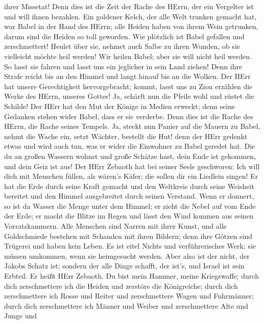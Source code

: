 ihrer Missetat! Denn dies ist die Zeit der Rache des HErrn, der ein
Vergelter ist und will ihnen bezahlen.  Ein goldener Kelch,
der alle Welt trunken gemacht hat, war Babel in der Hand des HErrn; alle
Heiden haben von ihrem Wein getrunken, darum sind die Heiden so toll
geworden.  Wie plötzlich ist Babel gefallen und
zerschmettert! Heulet über sie, nehmet auch Salbe zu ihren Wunden, ob
sie vielleicht möchte heil werden!  Wir heilen Babel; aber
sie will nicht heil werden. So lasst sie fahren und lasst uns ein
jeglicher in sein Land ziehen! Denn ihre Strafe reicht bis an den Himmel
und langt hinauf bis an die Wolken.  Der HErr hat unsere
Gerechtigkeit hervorgebracht; kommt, lasst uns zu Zion erzählen die
Werke des HErrn, unseres Gottes!  Ja, schärft nun die
Pfeile wohl und rüstet die Schilde! Der HErr hat den Mut der Könige in
Medien erweckt; denn seine Gedanken stehen wider Babel, dass er sie
verderbe. Denn dies ist die Rache des HErrn, die Rache seines Tempels.
 Ja, steckt nun Panier auf die Mauern zu Babel, nehmt die
Wache ein, setzt Wächter, bestellt die Hut! denn der HErr gedenkt etwas
und wird auch tun, was er wider die Einwohner zu Babel geredet hat.
 Die du an großen Wassern wohnst und große Schätze hast,
dein Ende ist gekommen, und dein Geiz ist aus!  Der HErr
Zebaoth hat bei seiner Seele geschworen: Ich will dich mit Menschen
füllen, als wären's Käfer; die sollen dir ein Liedlein singen!
 Er hat die Erde durch seine Kraft gemacht und den
Weltkreis durch seine Weisheit bereitet und den Himmel ausgebreitet
durch seinen Verstand.  Wenn er donnert, so ist da Wasser
die Menge unter dem Himmel; er zieht die Nebel auf vom Ende der Erde; er
macht die Blitze im Regen und lässt den Wind kommen aus seinen
Vorratskammern.  Alle Menschen sind Narren mit ihrer Kunst,
und alle Goldschmiede bestehen mit Schanden mit ihren Bildern; denn ihre
Götzen sind Trügerei und haben kein Leben.  Es ist eitel
Nichts und verführerisches Werk; sie müssen umkommen, wenn sie
heimgesucht werden.  Aber also ist der nicht, der Jakobs
Schatz ist; sondern der alle Dinge schafft, der ist's, und Israel ist
sein Erbteil. Er heißt HErr Zebaoth.  Du bist mein Hammer,
meine Kriegswaffe; durch dich zerschmettere ich die Heiden und zerstöre
die Königreiche;  durch dich zerschmettere ich Rosse und
Reiter und zerschmettere Wagen und Fuhrmänner;  durch dich
zerschmettere ich Männer und Weiber und zerschmettere Alte und Junge und
